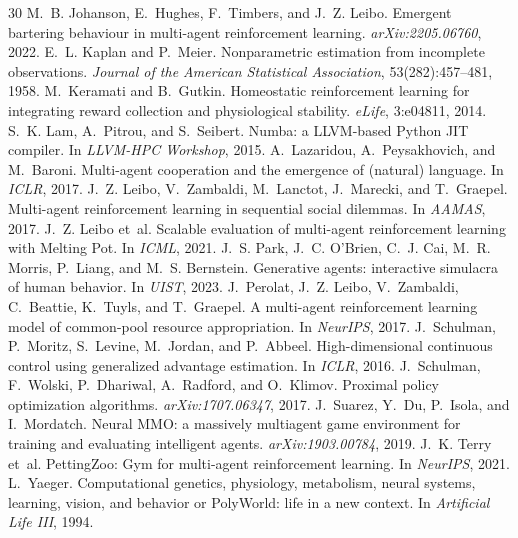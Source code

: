 \documentclass[10pt]{article}
\begin{document}
\begin{thebibliography}{30}
 M.~B. Johanson, E.~Hughes, F.~Timbers, and J.~Z. Leibo. Emergent bartering behaviour in multi-agent reinforcement learning. \emph{arXiv:2205.06760}, 2022.
 E.~L. Kaplan and P.~Meier. Nonparametric estimation from incomplete observations. \emph{Journal of the American Statistical Association}, 53(282):457--481, 1958.
 M.~Keramati and B.~Gutkin. Homeostatic reinforcement learning for integrating reward collection and physiological stability. \emph{eLife}, 3:e04811, 2014.
 S.~K. Lam, A.~Pitrou, and S.~Seibert. Numba: a LLVM-based Python JIT compiler. In \emph{LLVM-HPC Workshop}, 2015.
 A.~Lazaridou, A.~Peysakhovich, and M.~Baroni. Multi-agent cooperation and the emergence of (natural) language. In \emph{ICLR}, 2017.
 J.~Z. Leibo, V.~Zambaldi, M.~Lanctot, J.~Marecki, and T.~Graepel. Multi-agent reinforcement learning in sequential social dilemmas. In \emph{AAMAS}, 2017.
 J.~Z. Leibo et~al. Scalable evaluation of multi-agent reinforcement learning with Melting Pot. In \emph{ICML}, 2021.
 J.~S. Park, J.~C. O'Brien, C.~J. Cai, M.~R. Morris, P.~Liang, and M.~S. Bernstein. Generative agents: interactive simulacra of human behavior. In \emph{UIST}, 2023.
 J.~Perolat, J.~Z. Leibo, V.~Zambaldi, C.~Beattie, K.~Tuyls, and T.~Graepel. A multi-agent reinforcement learning model of common-pool resource appropriation. In \emph{NeurIPS}, 2017.
 J.~Schulman, P.~Moritz, S.~Levine, M.~Jordan, and P.~Abbeel. High-dimensional continuous control using generalized advantage estimation. In \emph{ICLR}, 2016.
 J.~Schulman, F.~Wolski, P.~Dhariwal, A.~Radford, and O.~Klimov. Proximal policy optimization algorithms. \emph{arXiv:1707.06347}, 2017.
 J.~Suarez, Y.~Du, P.~Isola, and I.~Mordatch. Neural MMO: a massively multiagent game environment for training and evaluating intelligent agents. \emph{arXiv:1903.00784}, 2019.
 J.~K. Terry et~al. PettingZoo: Gym for multi-agent reinforcement learning. In \emph{NeurIPS}, 2021.
 L.~Yaeger. Computational genetics, physiology, metabolism, neural systems, learning, vision, and behavior or PolyWorld: life in a new context. In \emph{Artificial Life III}, 1994.
\end{thebibliography}
\end{document}

